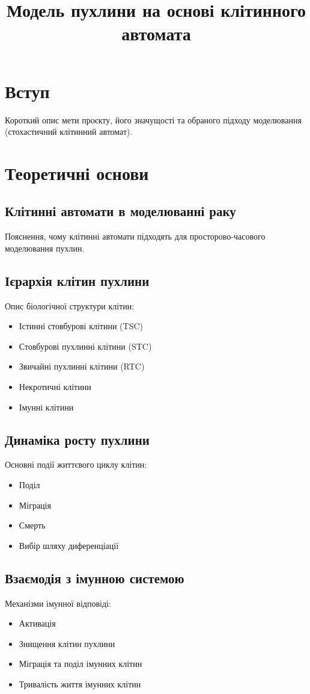 \documentclass{article}
\title{Модель пухлини на основі клітинного автомата}
\date{}
\begin{document}
\maketitle

\tableofcontents

\newpage

\section{Вступ}
Короткий опис мети проєкту, його значущості та обраного підходу моделювання (стохастичний клітинний автомат).

\section{Теоретичні основи}
\subsection{Клітинні автомати в моделюванні раку}
Пояснення, чому клітинні автомати підходять для просторово-часового моделювання пухлин.

\subsection{Ієрархія клітин пухлини}
Опис біологічної структури клітин:
\begin{itemize}
    \item Істинні стовбурові клітини (TSC)
    \item Стовбурові пухлинні клітини (STC)
    \item Звичайні пухлинні клітини (RTC)
    \item Некротичні клітини
    \item Імунні клітини
\end{itemize}

\subsection{Динаміка росту пухлини}
Основні події життєвого циклу клітин:
\begin{itemize}
    \item Поділ
    \item Міграція
    \item Смерть
    \item Вибір шляху диференціації
\end{itemize}

\subsection{Взаємодія з імунною системою}
Механізми імунної відповіді:
\begin{itemize}
    \item Активація
    \item Знищення клітин пухлини
    \item Міграція та поділ імунних клітин
    \item Тривалість життя імунних клітин
\end{itemize}
\end{document}
